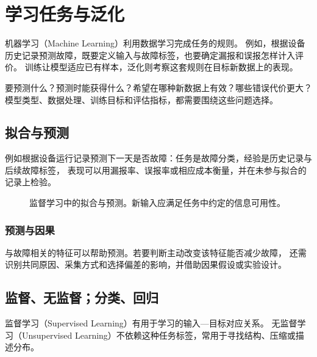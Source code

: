 \chapter{学习任务与泛化}
\label{ch:learning}
\par\smallskip

机器学习（Machine Learning）利用数据学习完成任务的规则。
例如，根据设备历史记录预测故障，既要定义输入与故障标签，也要确定漏报和误报怎样计入评价。
训练让模型适应已有样本，泛化则考察这套规则在目标新数据上的表现。

\begin{keyidea}[贯穿全书的四个问题]
要预测什么？预测时能获得什么？希望在哪种新数据上有效？哪些错误代价更大？
模型类型、数据处理、训练目标和评估指标，都需要围绕这些问题选择。
\end{keyidea}

\section{拟合与预测}
\label{sec:learn-workflow}
例如根据设备运行记录预测下一天是否故障：任务是故障分类，经验是历史记录与后续故障标签，
表现可以用漏报率、误报率或相应成本衡量，并在未参与拟合的记录上检验。

\begin{figure}[htbp]
\centering
\caption{监督学习中的拟合与预测。新输入应满足任务中约定的信息可用性。}
\par\smallskip
{}
\end{figure}

\subsection{预测与因果}
与故障相关的特征可以帮助预测。若要判断主动改变该特征能否减少故障，
还需识别共同原因、采集方式和选择偏差的影响，并借助因果假设或实验设计。


\section{监督、无监督；分类、回归}
\label{sec:learn-tasks}
监督学习（Supervised Learning）有用于学习的输入—目标对应关系。
无监督学习（Unsupervised Learning）不依赖这种任务标签，常用于寻找结构、压缩或描述分布。

